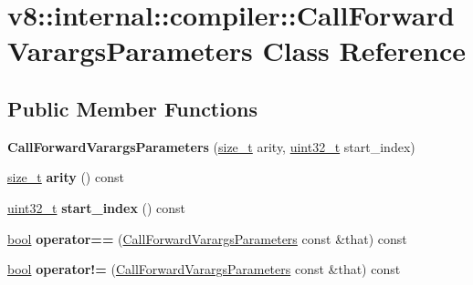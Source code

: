 \hypertarget{classv8_1_1internal_1_1compiler_1_1CallForwardVarargsParameters}{}\section{v8\+:\+:internal\+:\+:compiler\+:\+:Call\+Forward\+Varargs\+Parameters Class Reference}
\label{classv8_1_1internal_1_1compiler_1_1CallForwardVarargsParameters}
\subsection*{Public Member Functions}
\begin{DoxyCompactItemize}
\item 
\mbox{\label{classv8_1_1internal_1_1compiler_1_1CallForwardVarargsParameters_abc430376eb872e1b5fc5a8dda7e31c8a}} 
{\bfseries Call\+Forward\+Varargs\+Parameters} (\mbox{\hyperlink{classsize__t}{size\+\_\+t}} arity, \mbox{\hyperlink{classuint32__t}{uint32\+\_\+t}} start\+\_\+index)
\item 
\mbox{\label{classv8_1_1internal_1_1compiler_1_1CallForwardVarargsParameters_a501e978937583d3f907d4884371dad8c}} 
\mbox{\hyperlink{classsize__t}{size\+\_\+t}} {\bfseries arity} () const
\item 
\mbox{\label{classv8_1_1internal_1_1compiler_1_1CallForwardVarargsParameters_a6d6ead263f21dd1979f4852b614c9f87}} 
\mbox{\hyperlink{classuint32__t}{uint32\+\_\+t}} {\bfseries start\+\_\+index} () const
\item 
\mbox{\label{classv8_1_1internal_1_1compiler_1_1CallForwardVarargsParameters_a56c0b5a9fd26884dfd4de78cd79410eb}} 
\mbox{\hyperlink{classbool}{bool}} {\bfseries operator==} (\mbox{\hyperlink{classv8_1_1internal_1_1compiler_1_1CallForwardVarargsParameters}{Call\+Forward\+Varargs\+Parameters}} const \&that) const
\item 
\mbox{\label{classv8_1_1internal_1_1compiler_1_1CallForwardVarargsParameters_a47f032317c5d4d249ee3ea62985be4ab}} 
\mbox{\hyperlink{classbool}{bool}} {\bfseries operator!=} (\mbox{\hyperlink{classv8_1_1internal_1_1compiler_1_1CallForwardVarargsParameters}{Call\+Forward\+Varargs\+Parameters}} const \&that) const
\end{DoxyCompactItemize}
